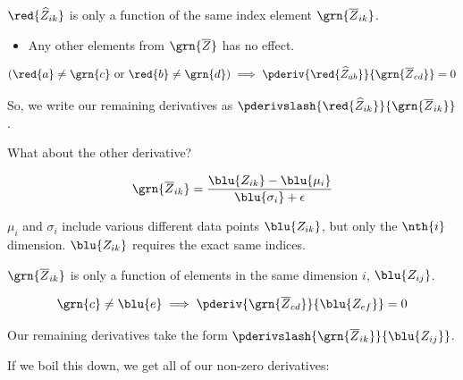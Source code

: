             \begin{concept}
                $\red{\widehat{Z}_{ik}}$  is only a function of the same index element $\grn{\overline{Z}_{ik}}$.

                \begin{itemize}
                    \item Any other elements from $\grn{\overline{Z}}$ has no effect.
                \end{itemize}

                \begin{equation*}
                    (\red{a} \neq \grn{c} \text{ or } \red{b} \neq \grn{d}) \implies 
                    \pderiv{ \red{\widehat{Z}_{ab}} }{ \grn{\overline{Z}_{cd} } }=0
                \end{equation*}

                So, we write our remaining derivatives as $\pderivslash{ \red{\widehat{Z}_{ik}} }{ \grn{\overline{Z}_{ik} } }$.
            \end{concept}
        

            What about the other derivative?

            \begin{equation*}
                \grn{ \overline{Z}_{ik} } =  \frac{ \blu{Z_{ik}}  -\blu{\mu_i}}{ \blu{\sigma_i}+\epsilon}
            \end{equation*}

            $\mu_i$ and $\sigma_i$ include various different data points $\blu{Z_{ik}}$, but only the $\nth{i}$ dimension. $\blu{Z_{ik}}$ requires the exact same indices.\\

            \begin{concept}
                $\grn{\overline{Z}_{ik}}$ is only a function of elements in the same dimension $i$, $\blu{Z_{ij}}$.

                \begin{equation*}
                    \grn{c} \neq \blu{e} \implies \pderiv{ \grn{\overline{Z}_{cd}} }{ \blu{Z_{ef}} } = 0
                \end{equation*}

                Our remaining derivatives take the form $\pderivslash{ \grn{\overline{Z}_{ik}} }{ \blu{Z_{ij}} }$.
            \end{concept}

            If we boil this down, we get all of our non-zero derivatives:

